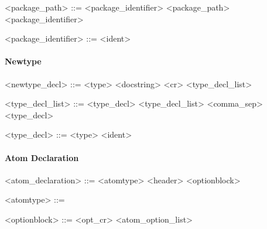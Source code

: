 \vs

\begin{grammar}
  <package_path> ::= <package_identifier>
  \alt <package_path>  <package_identifier>
\end{grammar}

\vs

\begin{grammar}
  <package_identifier> ::= <ident>
\end{grammar}


\paragraph{Newtype}

\begin{grammar}
  <newtype_decl> ::=  <type> <docstring> <cr> \tn{(}
  <type_decl_list> \tn{)}
\end{grammar}

\vs

\begin{grammar}
  <type_decl_list> ::= <type_decl>
  \alt <type_decl_list> <comma_sep> <type_decl>
\end{grammar}

\vs

\begin{grammar}
  <type_decl> ::= <type> \tn{:} <ident>
\end{grammar}


\paragraph{Atom Declaration}

\begin{grammar}
  <atom_declaration> ::=  <atomtype> <header> <optionblock>
\end{grammar}

\vs

\begin{grammar}
  <atomtype> ::= 
  \alt {}
  \alt {}
\end{grammar}

\vs

\begin{grammar}
  <optionblock> ::=  <opt_cr> \tn{(} <atom_option_list>
  \tn{)}
\end{grammar}

